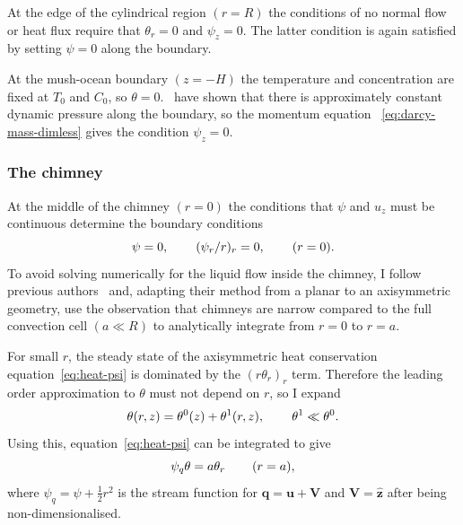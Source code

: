 \documentclass[11pt]{proc}
\makeatletter
\newcommand{\specialeqref}[2]{\begingroup
  \def\tagform@##1{\maketag@@@{(\ignorespaces##1\unskip\@@italiccorr#2)}}%
  \eqref{#1}\endgroup}
\makeatother
\begin{document}
At the edge of the cylindrical region $(r=R)$ the conditions of no normal flow or heat flux require that $\theta_r=0$ and $\psi_z=0$. The latter condition is again satisfied by setting $\psi = 0$ along the boundary.

At the mush-ocean boundary $(z=-H)$ the temperature and concentration are fixed at $T_0$ and $C_0$, so $\theta=0$.~\citet*{emms-fowler-94} have shown that there is approximately constant dynamic pressure along the boundary, so the momentum equation~\specialeqref{eq:darcy-mass-dimless}{a} gives the condition $\psi_z = 0$. 

\subsubsection{The chimney}
At the middle of the chimney $(r=0)$ the conditions that $\psi$ and $u_z$ must be continuous determine the boundary conditions 
\begin{equation}
\label{eq:axi-chimney-bcs}
\psi = 0, \hspace{5ex} (\psi_r/r)_r = 0,   \hspace{5ex} (r=0).
\end{equation}
To avoid solving numerically for the liquid flow inside the chimney, I follow previous authors~\citep*{schulze-worster-98,chung-worster-02,wells-et-al-10} and, adapting their method from a planar to an axisymmetric geometry, use the observation that chimneys are narrow compared to the full convection cell $(a\ll R)$ to analytically integrate from $r=0$ to $r=a$. 

For small $r$, the steady state of the axisymmetric heat conservation equation~\eqref{eq:heat-psi} is dominated by the $(r \theta_r)_r$ term. Therefore the leading order approximation to $\theta$ must not depend on $r$, so I expand
\begin{equation}
\label{eq:theta-approx}
\theta(r,z) = \theta^0(z) + \theta^1(r,z), \hspace{5ex} \theta^1 \ll \theta^0.
\end{equation}
Using this, equation~\eqref{eq:heat-psi} can be integrated to give
\begin{equation}
\label{eq:theta-a-bc}
\psi_q \theta = a \theta_r   \hspace{5ex} (r=a),
\end{equation}
where $\psi_q = \psi + \frac{1}{2} r^2$ is the stream function for $\mathbf{q} = \mathbf{u} + \mathbf{V}$ and $\mathbf{V} =  \mathbf{\hat{z}}$ after being non-dimensionalised.
\end{document}
